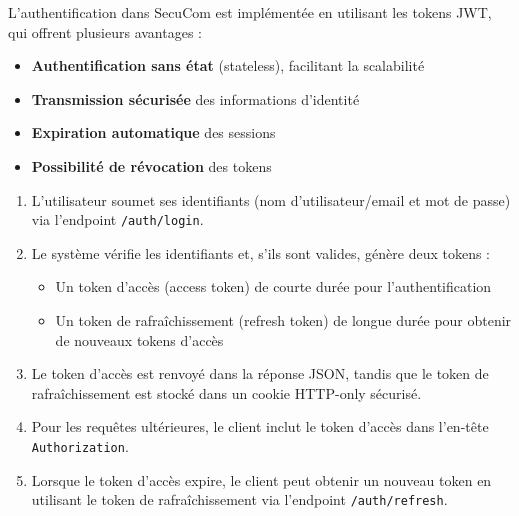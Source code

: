 L'authentification dans SecuCom est implémentée en utilisant les tokens JWT, qui offrent plusieurs avantages :
\begin{itemize}[leftmargin=*,label=\textcolor{darkgray}{$\bullet$},itemsep=0.3em]
  \item \textbf{Authentification sans état} (stateless), facilitant la scalabilité
  \item \textbf{Transmission sécurisée} des informations d'identité
  \item \textbf{Expiration automatique} des sessions
  \item \textbf{Possibilité de révocation} des tokens
\end{itemize}

\vspace{0.5cm}

\begin{tcolorbox}[
  title={\textbf{Processus d'authentification JWT}},
  colback=blue!5!white,
  colframe=primarycolor,
  fonttitle=\bfseries,
  boxrule=0.5mm,
  arc=2mm,
  left=6mm,
  right=6mm,
  top=6mm,
  bottom=6mm
]
\begin{enumerate}[itemsep=0.3em]
  \item L'utilisateur soumet ses identifiants (nom d'utilisateur/email et mot de passe) via l'endpoint \texttt{/auth/login}.
  \item Le système vérifie les identifiants et, s'ils sont valides, génère deux tokens :
    \begin{itemize}[leftmargin=*,label=\textcolor{darkgray}{$\bullet$},itemsep=0.3em]
      \item Un token d'accès (access token) de courte durée pour l'authentification
      \item Un token de rafraîchissement (refresh token) de longue durée pour obtenir de nouveaux tokens d'accès
    \end{itemize}
  \item Le token d'accès est renvoyé dans la réponse JSON, tandis que le token de rafraîchissement est stocké dans un cookie HTTP-only sécurisé.
  \item Pour les requêtes ultérieures, le client inclut le token d'accès dans l'en-tête \texttt{Authorization}.
  \item Lorsque le token d'accès expire, le client peut obtenir un nouveau token en utilisant le token de rafraîchissement via l'endpoint \texttt{/auth/refresh}.
\end{enumerate}
\end{tcolorbox}

